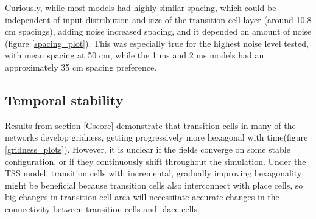 \documentclass{article}
\begin{document}
    Curiously, while most models had highly similar spacing, which could be independent of input distribution and size of the transition cell layer (around 10.8 cm spacings), adding noise increased spacing, and it depended on amount of noise (figure \ref{spacing_plot}). This was especially true for the highest noise level tested, with mean spacing at 50 cm, while the 1 ms and 2 ms models had an approximately 35 cm spacing preference.

    \subsection{Temporal stability} \label{TempStab}

    Results from section \ref{Gscore} demonstrate that transition cells in many of the networks develop gridness, getting progressively more hexagonal with time(figure \ref{gridness_plots}). However, it is unclear if the fields converge on some stable configuration, or if they continuously shift throughout the simulation. Under the TSS model, transition cells with incremental, gradually improving hexagonality might be beneficial because transition cells also interconnect with place cells, so big changes in transition cell area will necessitate accurate changes in the connectivity between transition cells and place cells.
\end{document}

